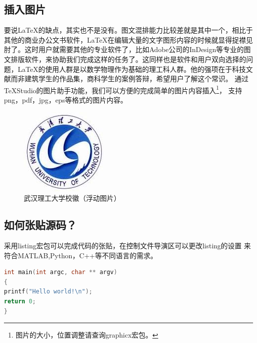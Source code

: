 \subsection{插入图片}
要说\LaTeX 的缺点，其实也不是没有。图文混排能力比较差就是其中一个，相比于其他的商业办公文书软件，\LaTeX 在编辑大量的文字图形内容的时候就显得捉襟见肘了。这时用户就需要其他的专业软件了，比如Adobe公司的InDesign等专业的图文排版软件，来协助我们完成这样的任务了。这同样也是软件和用户双向选择的问题，\LaTeX 的使用人群是以数学物理作为基础的理工科人群。他的强项在于科技文献而非建筑学生的作品集，商科学生的案例答辩，希望用户了解这个常识。
通过\TeX Studio的图片助手功能，我们可以方便的完成简单的图片内容插入\footnote[1]{图片的大小，位置调整请查询graphicx宏包。}， 支持png，pdf，jpg，eps等格式的图片内容。\\
\begin{figure}[htbp] 
\centering
\includegraphics {figure/logo}
\caption{武汉理工大学校徽（浮动图片）}
\label{fig:logo}
\end{figure}
\footnotemark[1]
\subsection{如何张贴源码？}
采用listing宏包可以完成代码的张贴，在控制文件导演区可以更改listing的设置
来符合MATLAB,Python，C++等不同语言的需求。
\begin{lstlisting}[language=C]
int main(int argc, char ** argv)
{
printf("Hello world!\n");
return 0;
}
\end{lstlisting}